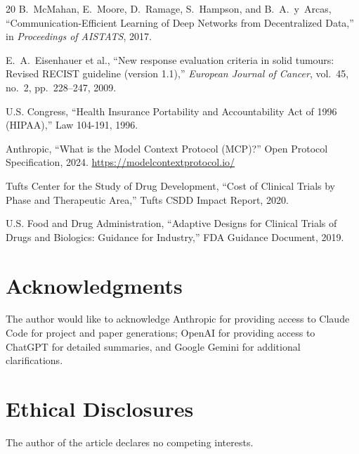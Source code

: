 \documentclass{article}
\begin{document}
\begin{thebibliography}{20}
B.~McMahan, E.~Moore, D.~Ramage, S.~Hampson, and B.~A.~y~Arcas, ``Communication-Efficient Learning of Deep Networks from Decentralized Data,'' in \textit{Proceedings of AISTATS}, 2017.

E.~A.~Eisenhauer et al., ``New response evaluation criteria in solid tumours: Revised RECIST guideline (version 1.1),'' \textit{European Journal of Cancer}, vol.~45, no.~2, pp.~228--247, 2009.

U.S. Congress, ``Health Insurance Portability and Accountability Act of 1996 (HIPAA),'' Law 104-191, 1996.

Anthropic, ``What is the Model Context Protocol (MCP)?'' Open Protocol Specification, 2024.
\url{https://modelcontextprotocol.io/}

Tufts Center for the Study of Drug Development, ``Cost of Clinical Trials by Phase and Therapeutic Area,'' Tufts CSDD Impact Report, 2020.

U.S. Food and Drug Administration, ``Adaptive Designs for Clinical Trials of Drugs and Biologics: Guidance for Industry,'' FDA Guidance Document, 2019.

\end{thebibliography}

\vspace{-0.15cm}

\section*{Acknowledgments}
\vspace{-0.2cm}
The author would like to acknowledge Anthropic for providing access to Claude Code for project and paper generations; OpenAI for providing access to ChatGPT for detailed summaries, and Google Gemini for additional clarifications.
\vspace{-0.2cm}
\section*{Ethical Disclosures}
\vspace{-0.2cm}
The author of the article declares no competing interests.
\vspace{-0.2cm}
\end{document}
